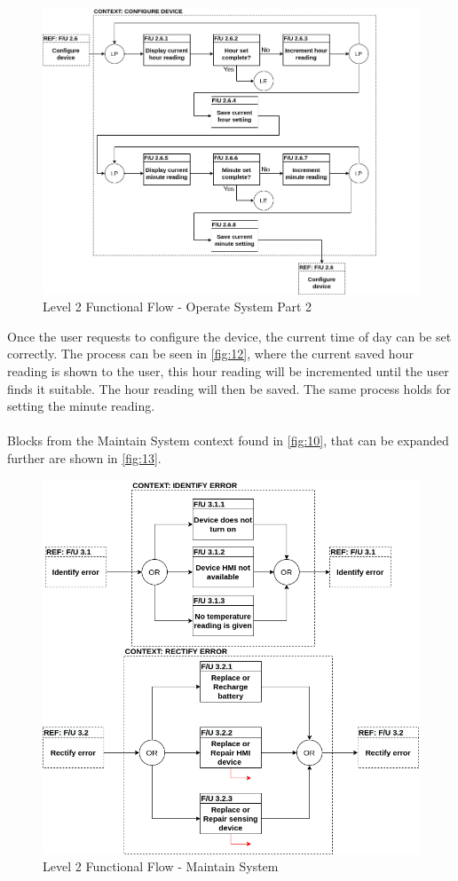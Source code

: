 \begin{figure}[H]
	\centering
	\includegraphics[scale=0.5]{img/L2FF2}
	\caption{Level 2 Functional Flow - Operate System Part 2}
	\label{fig:12}
\end{figure}
\noindent
Once the user requests to configure the device, the current time of day can be set correctly. The process can be seen in \autoref{fig:12}, where the current saved hour reading is shown to the user, this hour reading will be incremented until the user finds it suitable. The hour reading will then be saved. The same process holds for setting the minute reading. 
\\
\\
Blocks from the Maintain System context found in \autoref{fig:10}, that can be expanded further are shown in \autoref{fig:13}.
\begin{figure}[H]
	\centering
	\includegraphics[scale=0.5]{img/L2FF3}
	\caption{Level 2 Functional Flow - Maintain System}
	\label{fig:13}
\end{figure}
